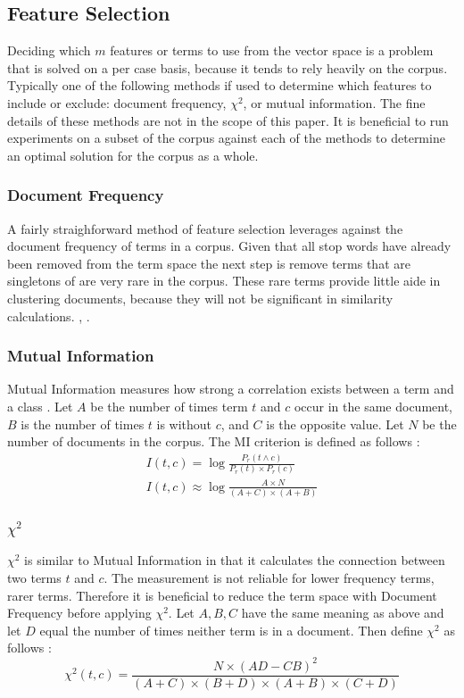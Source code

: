 \documentclass[11pt,twocolumn]{article}
\begin{document}
\subsection{Feature Selection}
Deciding which $m$ features or terms to use from the vector space is a problem that is solved on a per case basis, because it tends to rely heavily on the corpus.  Typically one of the following methods if used to determine which features to include or exclude: document frequency, $\chi^2$, or mutual information.  The fine details of these methods are not in the scope of this paper.  It is beneficial to run experiments on a subset of the corpus against each of the methods to determine an optimal solution for the corpus as a whole.

\subsubsection{Document Frequency}
A fairly straighforward method of feature selection leverages against the document frequency of terms in a corpus.  Given that all stop words have already been removed from the term space the next step is remove terms that are singletons of are very rare in the corpus.  These rare terms provide little aide in clustering documents, because they will not be significant in similarity calculations. \cite{Mann2008}, \cite{Yang1997}.

\subsubsection{Mutual Information}
Mutual Information measures how strong a correlation exists between a term and a class \cite{Mann2008}.  Let $A$ be the number of times term $t$ and $c$ occur in the same document, $B$ is the number of times $t$ is without $c$, and $C$ is the opposite value.  Let $N$ be the number of documents in the corpus.  The MI criterion is defined as follows \cite{Yang1997}:
\begin{eqnarray*}
I(t, c) = \log \frac{P_r(t \wedge c)}{P_r(t) \times P_r(c)}\\
I(t, c) \approx \log \frac{A \times N}{(A + C) \times (A + B)}
\end{eqnarray*}

\subsubsection{$\chi^2$}
$\chi^2$ is similar to Mutual Information in that it calculates the connection between two terms $t$ and $c$.  The measurement is not reliable for lower frequency terms, rarer terms.  Therefore it is beneficial to reduce the term space with Document Frequency before applying $\chi^2$.  Let $A, B, C$ have the same meaning as above and let $D$ equal the number of times neither term is in a document.  Then define $\chi^2$ as follows \cite{Yang1997}:
\begin{equation*}
\chi^2(t, c) = \frac{N \times (AD - CB)^2}{(A + C) \times (B + D) \times (A + B) \times (C + D)}
\end{equation*}
\end{document}
